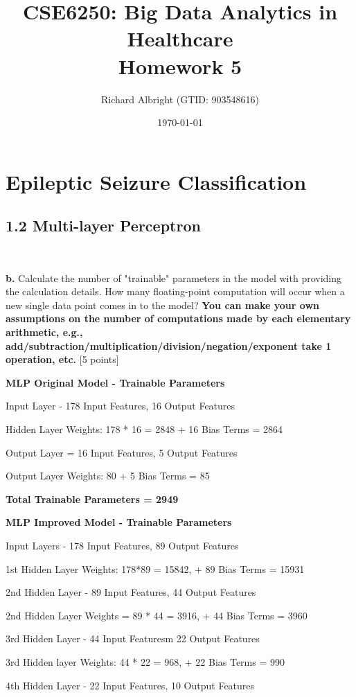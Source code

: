 \documentclass[12pt]{article}
\title{CSE6250: Big Data Analytics in Healthcare \\ Homework 5}
\author{Richard Albright (GTID: 903548616)}
\date{\today}
\begin{document}
\maketitle

\section{Epileptic Seizure Classification}

\subsection*{1.2 Multi-layer Perceptron}
~

\textbf{b.} Calculate the number of "trainable" parameters in the model with providing the calculation details. How many floating-point computation will occur when a new single data point comes in to the model?  \textbf{You can make your own assumptions on the number of computations made by each elementary arithmetic, e.g., add/subtraction/multiplication/division/negation/exponent take 1 operation, etc.} [5 points]

\bigskip

\textbf{MLP Original Model - Trainable Parameters}

Input Layer - 178 Input Features, 16 Output Features

Hidden Layer Weights: 178 * 16 = 2848 + 16 Bias Terms = 2864

Output Layer = 16 Input Features, 5 Output Features

Output Layer Weights: 80 + 5 Bias Terms = 85

\textbf{Total Trainable Parameters = 2949}

\bigskip

\textbf{MLP Improved Model - Trainable Parameters}

Input Layers - 178 Input Features, 89 Output Features

1st Hidden Layer Weights: 178*89 = 15842, + 89 Bias Terms = 15931

2nd Hidden Layer - 89 Input Features, 44 Output Features

2nd Hidden Layer Weights = 89 * 44 = 3916, + 44 Bias Terms = 3960

3rd Hidden Layer - 44 Input Featuresm 22 Output Features

3rd Hidden layer Weights: 44 * 22 = 968, + 22 Bias Terms = 990

4th Hidden Layer - 22 Input Features, 10 Output Features
\end{document}
